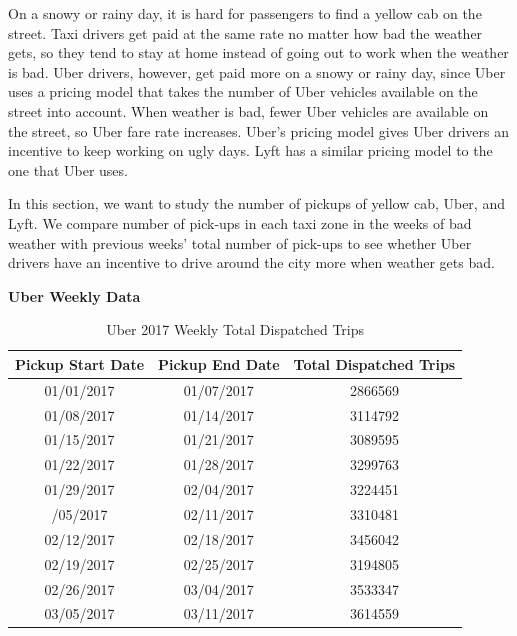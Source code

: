 \documentclass[12pt,twoside]{reedthesis}
\theoremstyle{definition}
\theoremstyle{definition}
\theoremstyle{definition}
\theoremstyle{remark}
\begin{document}
On a snowy or rainy day, it is hard for passengers to find a yellow cab
on the street. Taxi drivers get paid at the same rate no matter how bad
the weather gets, so they tend to stay at home instead of going out to
work when the weather is bad. Uber drivers, however, get paid more on a
snowy or rainy day, since Uber uses a pricing model that takes the
number of Uber vehicles available on the street into account. When
weather is bad, fewer Uber vehicles are available on the street, so Uber
fare rate increases. Uber's pricing model gives Uber drivers an
incentive to keep working on ugly days. Lyft has a similar pricing model
to the one that Uber uses.

In this section, we want to study the number of pickups of yellow cab,
Uber, and Lyft. We compare number of pick-ups in each taxi zone in the
weeks of bad weather with previous weeks' total number of pick-ups to
see whether Uber drivers have an incentive to drive around the city more
when weather gets bad.

\textbf{Uber Weekly Data}
\begin{table}

\caption{\label{tab:unnamed-chunk-65}Uber 2017 Weekly Total Dispatched Trips}
\centering
\begin{tabular}[t]{ccc}
\toprule
Pickup Start Date & Pickup End Date & Total Dispatched Trips\\
\midrule
01/01/2017 & 01/07/2017 & 2866569\\
01/08/2017 & 01/14/2017 & 3114792\\
01/15/2017 & 01/21/2017 & 3089595\\
01/22/2017 & 01/28/2017 & 3299763\\
01/29/2017 & 02/04/2017 & 3224451\\
\addlinespace
02/05/2017 & 02/11/2017 & 3310481\\
02/12/2017 & 02/18/2017 & 3456042\\
02/19/2017 & 02/25/2017 & 3194805\\
02/26/2017 & 03/04/2017 & 3533347\\
03/05/2017 & 03/11/2017 & 3614559\\
\bottomrule
\end{tabular}
\end{table}
\end{document}
